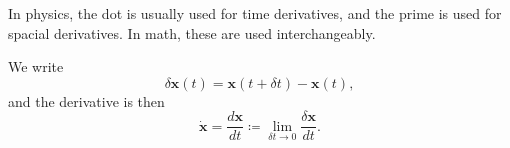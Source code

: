 \begin{eg}
    In physics, the dot is usually used for time derivatives, and the prime is used for spacial derivatives. In math, these are used interchangeably.

    We write
    \[
        \delta \mathbf{x} (t) = \mathbf{x} (t + \delta t) - \mathbf{x} (t),
    \]
    and the derivative is then
    \[
        \dot{\mathbf{x}} = \frac{d \mathbf{x} }{dt}\coloneqq \lim\limits_{\delta t \to 0} \frac{\delta \mathbf{x}}{dt}.
    \]
\end{eg}